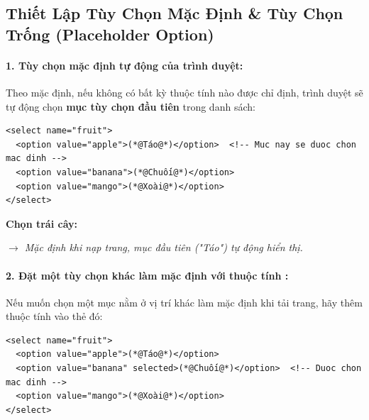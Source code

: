 \subsection{Thiết Lập Tùy Chọn Mặc Định \& Tùy Chọn Trống (Placeholder Option)}

\paragraph{1. Tùy chọn mặc định tự động của trình duyệt:}
Theo mặc định, nếu không có bất kỳ thuộc tính  nào được chỉ định, trình duyệt sẽ tự động chọn \textbf{mục tùy chọn đầu tiên} trong danh sách:

\begin{codeWindow}
\begin{lstlisting}[language=HTML5]
<select name="fruit">
  <option value="apple">(*@Táo@*)</option>  <!-- Muc nay se duoc chon mac dinh -->
  <option value="banana">(*@Chuối@*)</option>
  <option value="mango">(*@Xoài@*)</option>
</select>
\end{lstlisting}
\end{codeWindow}

\begin{browserWindow}
\sffamily\small
\textbf{Chọn trái cây:} \par\vspace{4pt}
\tcbox[on line, arc=3pt, colback=white, colframe=primaryBlue!50, boxsep=3pt, left=8pt, right=20pt, top=3pt, bottom=3pt]{%
  \small \textcolor{black}{Táo} \;\; \textcolor{primaryBlue}{\textbf{$\boldsymbol{\vee}$}}%
} \par\vspace{4pt}
\textcolor{codeComment}{\small\textit{$\rightarrow$ Mặc định khi nạp trang, mục đầu tiên ("Táo") tự động hiển thị.}}
\end{browserWindow}

\paragraph{2. Đặt một tùy chọn khác làm mặc định với thuộc tính :}
Nếu muốn chọn một mục nằm ở vị trí khác làm mặc định khi tải trang, hãy thêm thuộc tính  vào thẻ  đó:

\begin{codeWindow}
\begin{lstlisting}[language=HTML5]
<select name="fruit">
  <option value="apple">(*@Táo@*)</option>
  <option value="banana" selected>(*@Chuối@*)</option>  <!-- Duoc chon mac dinh -->
  <option value="mango">(*@Xoài@*)</option>
</select>
\end{lstlisting}
\end{codeWindow}

